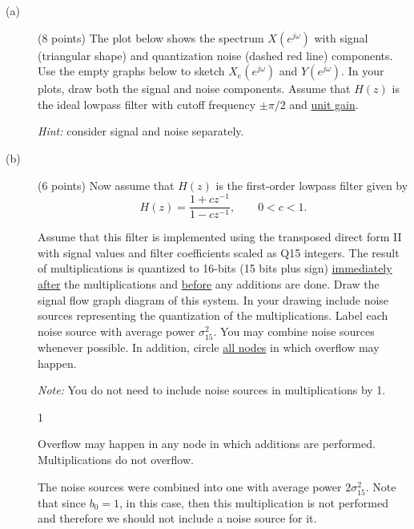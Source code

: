 \documentclass[10pt]{article}
\def\SOLUTIONS{0} %
\def\SolutionsColor{red2}
\begin{document}
\begin{description}
\item[(a)] (8 points) The plot below shows the spectrum $X(e^{j\omega})$ with signal (triangular shape) and quantization noise (dashed red line) components. Use the empty graphs below to sketch $X_e(e^{j\omega})$ and $Y(e^{j\omega})$. In your plots, draw both the signal and noise components. Assume that $H(z)$ is the ideal lowpass filter with cutoff frequency $\pm\pi/2$ and \underline{unit gain}.

\textit{Hint:} consider signal and noise separately.
 
\FloatBarrier
\begin{figure}[!h]
\centering
	\resizebox{0.9\textwidth}{!}{} \label{fig:spectrum_upsample}
\end{figure}
\FloatBarrier

\item[(b)] (6 points) Now assume that $H(z)$ is the first-order lowpass filter given by
\begin{equation}
H(z) = \frac{1 + cz^{-1}}{1 - cz^{-1}}, \qquad 0 < c < 1.
\end{equation}

Assume that this filter is implemented using the transposed direct form II with signal values and filter coefficients scaled as Q15 integers. The result of multiplications is quantized to 16-bits (15 bits plus sign) \underline{immediately after} the multiplications and \underline{before} any additions are done. Draw the signal flow graph diagram of this system. In your drawing include noise sources representing the quantization of the multiplications. Label each noise source with average power $\sigma_{15}^2$. You may combine noise sources whenever possible. In addition, circle \underline{all nodes} in which overflow may happen.

\textit{Note:} You do not need to include noise sources in multiplications by 1.

\if\SOLUTIONS1
{\color{\SolutionsColor}
Overflow may happen in any node in which additions are performed. Multiplications do not overflow. 

The noise sources were combined into one with average power $2\sigma_{15}^2$. Note that since $b_0 = 1$, in this case, then this multiplication is not performed and therefore we should not include a noise source for it.

\FloatBarrier
\begin{figure}[h!]
\centering
	\def\SolD{1}
	\resizebox{0.5\textwidth}{!}{}
\end{figure}
\FloatBarrier
}
\else\vspace{7cm}
\fi


\end{description}
\end{document}
